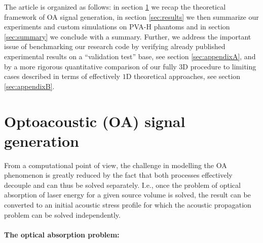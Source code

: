 \documentclass[12pt]{iopart}
\begin{document}
The article is organized as follows: in section \ref{sec:theory} we recap the
theoretical framework of OA signal generation, in section \ref{sec:results} we
then summarize our experiments and custom simulations on PVA-H phantoms and in
section \ref{sec:summary} we conclude with a summary. 
Further, we address the important issue of benchmarking our research code by
verifying already published experimental results on a ``validation test'' base,
see section \ref{sec:appendixA}, and by a more rigorous quantitative comparison 
of our fully $3$D procedure to limiting cases described in terms of effectively 
$1$D theoretical approaches, see section \ref{sec:appendixB}.  

\section{Optoacoustic (OA) signal generation}
\label{sec:theory}

From a computational point of view, the challenge in modelling the OA
phenomenon is greatly reduced by the fact that both processes effectively
decouple and can thus be solved separately.  I.e., once the problem of optical
absorption of laser energy for a given source volume is solved, the result can
be converted to an initial acoustic stress profile for which the acoustic
propagation problem can be solved independently. 

\paragraph{The optical absorption problem:}
\end{document}
